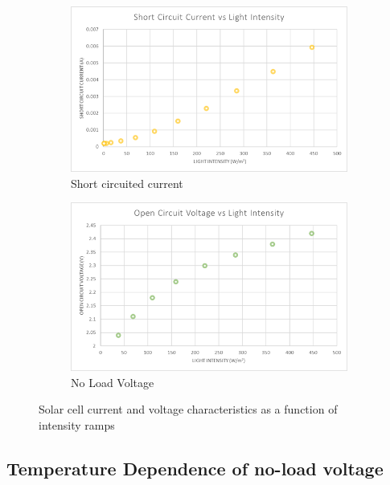 \begin{figure}[ht] 
  \begin{subfigure}[b]{0.45\linewidth}
    \centering
    \includegraphics[width=0.90\linewidth]{figures/I_Intensity.png} 
    \caption{Short circuited current} 
    \label{fig:I_intensity} 
    \vspace{4ex}
  \end{subfigure}%
  \begin{subfigure}[b]{0.45\linewidth}
    \centering
    \includegraphics[width=0.90\linewidth]{figures/V_Intensity.png} 
    \caption{No Load Voltage} 
    \label{fig:V_intensity} 
    \vspace{4ex}
  \end{subfigure} 
  \caption{Solar cell current and voltage characteristics as a function of intensity ramps}
  \label{fig:intensity} 
\end{figure}

\clearpage

\subsection{Temperature Dependence of no-load voltage}

